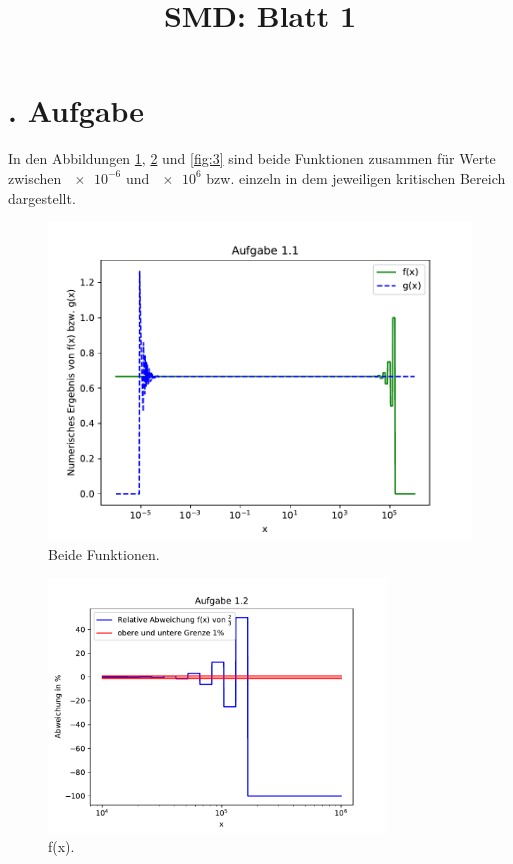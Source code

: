 \documentclass[
  bibliography=totoc,     %
  captions=tableheading,  %
  titlepage=firstiscover, %
]{scrartcl}
\title{SMD: Blatt 1}
\author{
  Sophie Bork
  \texorpdfstring{
    \\
    \href{mailto:sophie.bork@udo.edu}{sophie.bork@udo.edu}
  }{}
  \texorpdfstring{\and}{, }
  Michael Windau
  \texorpdfstring{
    \\
    \href{mailto:michael.windau@udo.edu}{michael.windau@udo.edu}
  }{}
  \texorpdfstring{\and}{, }
  Simon Schulte
  \texorpdfstring{
    \\
    \href{mailto:simon.schulte@udo.edu}{simon.schulte@udo.edu}
  }{}
}
\begin{document}
\maketitle
\thispagestyle{empty}
\newpage
\setcounter{page}{1}
\section{. Aufgabe}
\noindent
In den Abbildungen \ref{fig:1}, \ref{fig:2} und \ref{fig:3} sind beide Funktionen
zusammen für Werte zwischen $\num{e-6}$ und $\num{e6}$ bzw. einzeln in dem
jeweiligen kritischen Bereich dargestellt.
\begin{figure}[H]
  \centering
  \includegraphics[width=\textwidth]{aufgabe11.pdf}
  \caption{Beide Funktionen.}
  \label{fig:1}
\end{figure}
\begin{figure}[H]
  \centering
  \includegraphics[width=0.8\textwidth]{aufgabe12.pdf}
  \caption{f(x).}
  \label{fig:2}
\end{figure}
\end{document}
